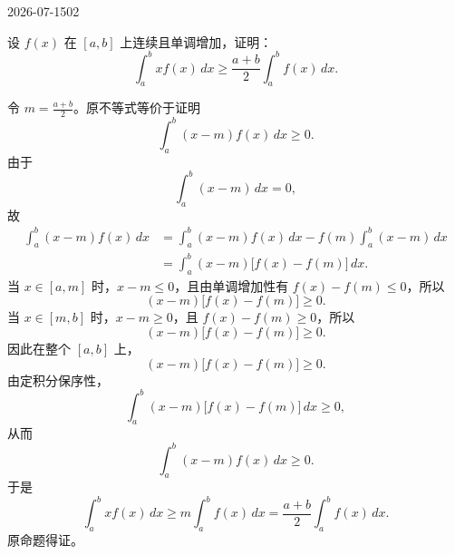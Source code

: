 \begin{mistake}{2026-07-15}{02}

\begin{problemcontent}
设 \(f(x)\) 在 \([a,b]\) 上连续且单调增加，证明：
\[
\int_a^b x f(x)\,dx \ge \frac{a+b}{2}\int_a^b f(x)\,dx.
\]
\end{problemcontent}

\begin{solutioncontent}
令 \(m=\frac{a+b}{2}\)。原不等式等价于证明
\[
\int_a^b (x-m)f(x)\,dx\ge 0.
\]
由于
\[
\int_a^b (x-m)\,dx=0,
\]
故
\[
\begin{aligned}
\int_a^b (x-m)f(x)\,dx
&=\int_a^b (x-m)f(x)\,dx-f(m)\int_a^b (x-m)\,dx\\
&=\int_a^b (x-m)\bigl[f(x)-f(m)\bigr] \,dx.
\end{aligned}
\]
当 \(x\in[a,m]\) 时，\(x-m\le 0\)，且由单调增加性有 \(f(x)-f(m)\le 0\)，所以
\[
(x-m)\bigl[f(x)-f(m)\bigr]\ge 0.
\]
当 \(x\in[m,b]\) 时，\(x-m\ge 0\)，且 \(f(x)-f(m)\ge 0\)，所以
\[
(x-m)\bigl[f(x)-f(m)\bigr]\ge 0.
\]
因此在整个 \([a,b]\) 上，
\[
(x-m)\bigl[f(x)-f(m)\bigr]\ge 0.
\]
由定积分保序性，
\[
\int_a^b (x-m)\bigl[f(x)-f(m)\bigr] \,dx\ge 0,
\]
从而
\[
\int_a^b (x-m)f(x)\,dx\ge 0.
\]
于是
\[
\int_a^b x f(x)\,dx\ge m\int_a^b f(x)\,dx=\frac{a+b}{2}\int_a^b f(x)\,dx.
\]
原命题得证。
\end{solutioncontent}


\end{mistake}
